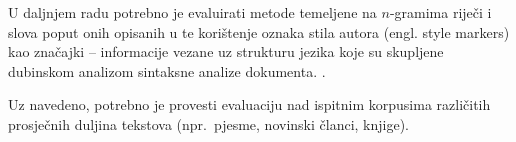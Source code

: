 \documentclass{article}
\begin{document}
U daljnjem radu potrebno je evaluirati metode temeljene na $n$-gramima riječi i
slova poput onih opisanih u
\citep{keselj2003n,peng2003language,coyotl2006authorship} te korištenje oznaka
stila autora (engl. style markers) kao značajki – informacije vezane uz strukturu
jezika koje su skupljene dubinskom analizom sintaksne analize dokumenta.
\citep{stamatatos2001computer,diri2003automatic,luyckx2005shallow}.

Uz navedeno, potrebno je provesti evaluaciju nad ispitnim korpusima različitih
prosječnih duljina tekstova (npr.~pjesme, novinski članci, knjige).

\newpage




\newpage

\appendix
\end{document}
